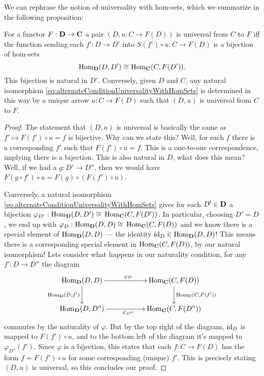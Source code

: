 
We can rephrase the notion of universality with hom-sets, which
we summarize in the following proposition:
\begin{prop}\label{prop:firstPropositionInYonedaLemma}
For a functor $F:\mathbf{D}\to\mathbf{C}$ a pair $(D,u:C\to{}F(D))$ is
universal from $C$ to $F$ iff the function sending each
$f':D\to{}D'$ into $S(f')\circ{}u:C\to{}F(D)$ is a bijection of
hom-sets
\begin{equation}\label{eq:alternateConditionUniversalityWithHomSets}
\operatorname{Hom}_{\mathbf{D}}(D,D')\cong\operatorname{Hom}_{\mathbf{C}}(C,F(D')).
\end{equation}
This bijection is natural in $D'$. Conversely, given $D$ and $C$,
any natural isomorphism \eqref{eq:alternateConditionUniversalityWithHomSets} is determined in this way by a
unique arrow $u:C\to{}F(D)$ such that $(D,u)$ is universal from
$C$ to $F$.
\end{prop}
\begin{proof}
The statement that $(D,u)$ is universal is basically the same as
$f'\mapsto{}F(f')\circ{}u=f$ is bijective. Why can we state this?
Well, for each $f$ there is a corresponding $f'$ such that
$F(f')\circ{}u=f$. This is a one-to-one correspondence, implying
there is a bijection. This is also natural in $D$, what does this
mean? Well, if we had a $g:D'\to{}D''$, then we would have
$F(g\circ{}f')\circ{}u=F(g)\circ{}(F(f')\circ{}u)$. 

Conversely, a natural isomorphism
\eqref{eq:alternateConditionUniversalityWithHomSets} gives for
each $D'\in\mathbf{D}$ a bijection
$\varphi_{D'}:\operatorname{Hom}_{\mathbf{D}}(D,D')\cong{}\operatorname{Hom}_{\mathbf{C}}(C,F(D'))$. In
particular, choosing $D'=D$, we end up with
$\varphi_{D}:\operatorname{Hom}_{\mathbf{D}}(D,D)\cong{}\operatorname{Hom}_{\mathbf{C}}(C,F(D))$ and
we know there is a special element of $\operatorname{Hom}_{\mathbf{D}}(D,D)$ ---
the identity $\operatorname{id}_{D}\in\operatorname{Hom}_{\mathbf{D}}(D,D)$! This means there is a
corresponding special element in $\operatorname{Hom}_{\mathbf{C}}(C,F(D))$, by our
natural isomorphism! Lets consider what happens in our naturality
condition, for any $f':D\to{}D''$ the diagram
\begin{equation}%
\vcenter{\xymatrix{
\hom_{\ms{D}}(D,D)\ar[d]_{\hom_{\ms{D}}(D,f')}\ar[rr]^{\varphi_{D}}
&& \hom_{\ms{C}}(C,F(D))\ar[d]^{\hom_{\ms{C}}(C,F(f'))}\\
\hom_{\ms{D}}(D,D'')\ar[rr]_{\varphi_{D''}} && \hom_{\ms{C}}(C,F(D''))
}}
\end{equation}
commutes by the naturality of $\varphi$. But by the top right of
the diagram, $\operatorname{id}_{D}$ is mapped to $F(f')\circ{}u$, and to the
bottom left of the diagram it's mapped to
$\varphi_{D''}(f')$. Since $\varphi$ is a bijection, this states
that each $f:C\to{}F(D)$ has the form $f=F(f')\circ{}u$ for some
corresponding (unique) $f'$. This is precisely stating $(D,u)$ is
universal, so this concludes our proof.
\end{proof}

